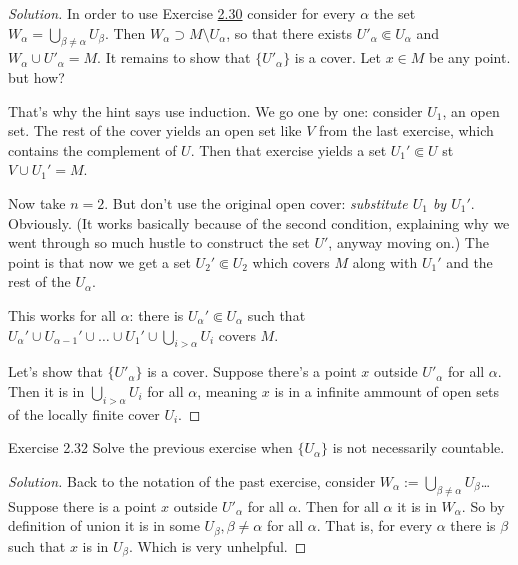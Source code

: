 \begin{proof}[Solution]\leavevmode
In order to use Exercise \hyperref[exer:2.30]{2.30} consider for every \(\alpha\) the set \(W_\alpha=\bigcup_{\beta \neq  \alpha} U_\beta\). Then \(W_\alpha \supset M\setminus U_\alpha\), so that there exists \(U'_\alpha \Subset U_\alpha\) and \(W_\alpha \cup U'_\alpha=M\). It remains to show that \(\{U'_\alpha\}\) is a cover. Let \(x \in M\) be any point. but how?

That's why the hint says use induction. We go one by one: consider \(U_1\), an open set. The rest of the cover yields an open set like  \(V\) from the last exercise, which contains the complement of  \(U\). Then that exercise yields a set  \(U_1' \Subset U\) st \(V \cup  U_1' = M\).

Now take \(n=2\). But don't use the original open cover:  \textit{substitute \(U_1\) by \(U_1'\)}. Obviously. (It works basically because of the second condition, explaining why we went through so much hustle to construct the set \(U'\), anyway moving on.) The point is that now we get a set \(U_2' \Subset U_2\) which covers \(M\) along with \(U_1'\) and the rest of the \(U_\alpha\).

This works for all $\alpha$: there is \(U_\alpha' \Subset U_\alpha\) such that \(U_\alpha' \cup  U_{\alpha-1}' \cup  \ldots \cup U_1' \cup \bigcup_{i>\alpha}U_i\) covers \(M\).

Let's show that \(\{U'_\alpha\}\) is a cover. Suppose there's a point \(x\) outside \(U'_\alpha\) for all \(\alpha\). Then it is in \(\bigcup_{i>\alpha}U_i\) for all \(\alpha\), meaning 
\(x\) is in a infinite ammount of open sets of the locally finite cover \(U_i\).
\end{proof}

\begin{thing4}{Exercise 2.32}\label{exer:2.32}\leavevmode
Solve the previous exercise when \(\{U_\alpha\}\) is not necessarily countable.
\end{thing4}

\begin{proof}[Solution]\leavevmode
Back to the notation of the past exercise, consider \(W_\alpha:=\bigcup_{\beta \neq  \alpha}U_\beta\)… Suppose there is a point $x$ outside \(U'_\alpha\) for all \(\alpha\). Then for all \(\alpha\) it is in \(W_\alpha\). So by definition of union it is in some \(U_\beta, \beta \neq  \alpha\) for all \(\alpha\). That is, for every \(\alpha\) there is \(\beta\) such that \(x\) is in \(U_\beta\). Which is very unhelpful.
\end{proof}

